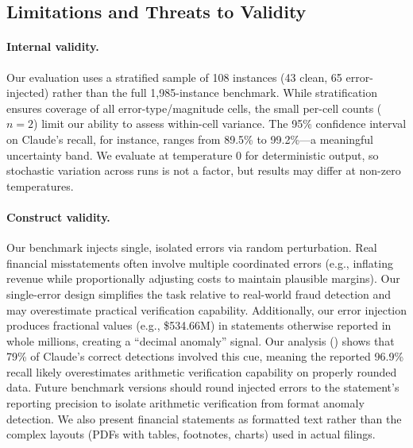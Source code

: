 \documentclass[11pt]{article}
\begin{document}
\subsection{Limitations and Threats to Validity}
\label{sec:limitations}

\paragraph{Internal validity.}
Our evaluation uses a stratified sample of 108 instances (43 clean, 65 error-injected) rather than the full 1,985-instance benchmark.
While stratification ensures coverage of all error-type/magnitude cells, the small per-cell counts ($n=2$) limit our ability to assess within-cell variance.
The 95\% confidence interval on Claude's recall, for instance, ranges from 89.5\% to 99.2\%---a meaningful uncertainty band.
We evaluate at temperature 0 for deterministic output, so stochastic variation across runs is not a factor, but results may differ at non-zero temperatures.

\paragraph{Construct validity.}
Our benchmark injects single, isolated errors via random perturbation.
Real financial misstatements often involve multiple coordinated errors (e.g., inflating revenue while proportionally adjusting costs to maintain plausible margins).
Our single-error design simplifies the task relative to real-world fraud detection and may overestimate practical verification capability.
Additionally, our error injection produces fractional values (e.g., \$534.66M) in statements otherwise reported in whole millions, creating a ``decimal anomaly'' signal.
Our analysis () shows that 79\% of Claude's correct detections involved this cue, meaning the reported 96.9\% recall likely overestimates arithmetic verification capability on properly rounded data.
Future benchmark versions should round injected errors to the statement's reporting precision to isolate arithmetic verification from format anomaly detection.
We also present financial statements as formatted text rather than the complex layouts (PDFs with tables, footnotes, charts) used in actual filings.
\end{document}
